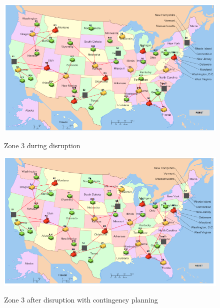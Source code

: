 \begin{figure}[H]
  \centering
  \includegraphics[width=6.5in]{figures/pdf/Z3BD.png}\\
  \caption{Zone 3 during disruption}\label{Z3BD}
\end{figure}  

\begin{figure}[H]
  \centering
  \includegraphics[width=6.5in]{figures/pdf/Z3AD.png}\\
  \caption{Zone 3 after disruption with contingency planning}\label{Z3AD}
\end{figure}  

